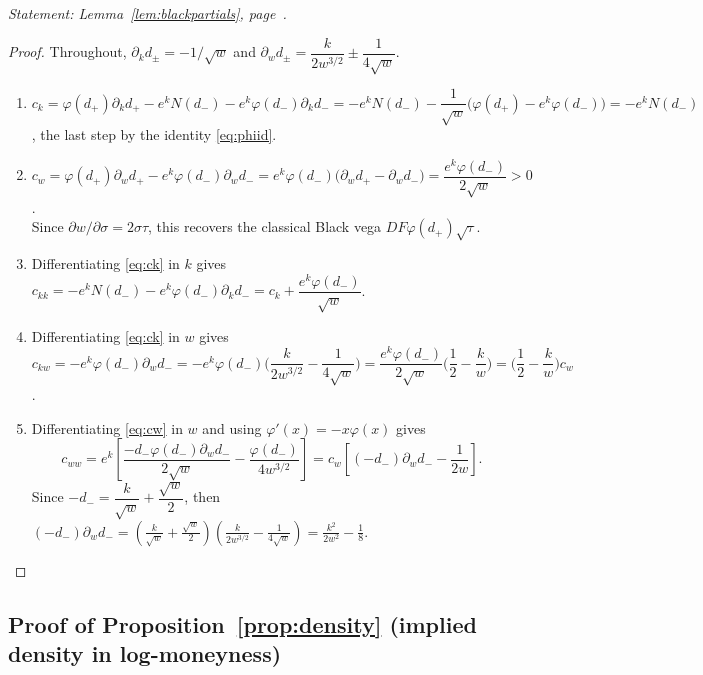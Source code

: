 \noindent\emph{Statement: Lemma~\ref{lem:blackpartials}, page~\pageref{lem:blackpartials}.}\medskip

\begin{proof}
Throughout, $\partial_k d_\pm=-1/\sqrt w$ and
$\partial_w d_\pm=\dfrac{k}{2w^{3/2}}\pm\dfrac{1}{4\sqrt w}$.

\begin{enumerate}[label=\textup{(\roman*)}, leftmargin=*]

\item
$c_k=\varphi(d_+)\partial_kd_+-e^kN(d_-)-e^k\varphi(d_-)\partial_kd_-
=-e^kN(d_-)-\dfrac{1}{\sqrt w}\bigl(\varphi(d_+)-e^k\varphi(d_-)\bigr)
=-e^kN(d_-)$,
the last step by the identity \eqref{eq:phiid}.

\item
$c_w=\varphi(d_+)\partial_wd_+-e^k\varphi(d_-)\partial_wd_-
=e^k\varphi(d_-)\bigl(\partial_wd_+-\partial_wd_-\bigr)
=\dfrac{e^k\varphi(d_-)}{2\sqrt w}>0$.\\
Since $\partial w/\partial\sigma=2\sigma\tau$, this recovers the classical
Black vega $DF\varphi(d_+)\sqrt\tau$.

\item
Differentiating \eqref{eq:ck} in $k$ gives
$c_{kk}=-e^kN(d_-)-e^k\varphi(d_-)\partial_kd_-
=c_k+\dfrac{e^k\varphi(d_-)}{\sqrt w}$.

\item
Differentiating \eqref{eq:ck} in $w$ gives
$c_{kw}=-e^k\varphi(d_-)\partial_wd_-
=-e^k\varphi(d_-)\bigl(\dfrac{k}{2w^{3/2}}-\dfrac{1}{4\sqrt w}\bigr)
=\dfrac{e^k\varphi(d_-)}{2\sqrt w}\bigl(\dfrac12-\dfrac{k}{w}\bigr)
=\bigl(\dfrac12-\dfrac{k}{w}\bigr)c_w$.

\item
Differentiating \eqref{eq:cw} in $w$ and using $\varphi'(x)=-x\varphi(x)$ gives
\[
c_{ww}
=e^k\left[
\frac{-d_-\varphi(d_-)\partial_wd_-}{2\sqrt w}
-\frac{\varphi(d_-)}{4w^{3/2}}
\right]
=c_w\left[(-d_-)\partial_wd_--\frac{1}{2w}\right].
\]
Since $-d_-=\dfrac{k}{\sqrt w}+\dfrac{\sqrt w}{2}$, then $(-d_-)\partial_wd_-
=\left(\frac{k}{\sqrt w}+\frac{\sqrt w}{2}\right)
\left(\frac{k}{2w^{3/2}}-\frac{1}{4\sqrt w}\right)
=\frac{k^2}{2w^2}-\frac18$.
\end{enumerate}
\end{proof}

\subsection{Proof of Proposition~\ref{prop:density} (implied density in log-moneyness)}
\label{proof:density}

